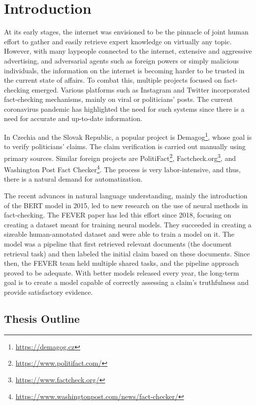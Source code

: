 \chapter*{Introduction}

At its early stages, the internet was envisioned to be the pinnacle of joint human effort to gather and easily retrieve expert knowledge on virtually any topic.
However, with many laypeople connected to the internet, extensive and aggressive advertising, and adversarial agents such as foreign powers or simply malicious individuals, the information on the internet is becoming harder to be trusted in the current state of affairs.
To combat this, multiple projects focused on fact-checking emerged. 
Various platforms such as Instagram and Twitter incorporated fact-checking mechanisms, mainly on viral or politicians' posts.
The current coronavirus pandemic has highlighted the need for such systems since there is a need for accurate and up-to-date information. 

In Czechia and the Slovak Republic, a popular project is Demagog\footnote{\url{https://demagog.cz}}, whose goal is to verify politicians' claims.
The claim verification is carried out manually using primary sources. 
Similar foreign projects are PolitiFact\footnote{\url{https://www.politifact.com/}}, Factcheck.org\footnote{\url{https://www.factcheck.org/}}, and Washington Post Fact Checker\footnote{\url{https://www.washingtonpost.com/news/fact-checker/}}.
The process is very labor-intensive, and thus, there is a natural demand for automatization.

The recent advances in natural language understanding, mainly the introduction of the BERT model \citep{bert} in 2015, led to new research on the use of neural methods in fact-checking.
The FEVER paper \citep{fever} has led this effort since 2018, focusing on creating a dataset meant for training neural models.
They succeeded in creating a sizeable human-annotated dataset and were able to train a model on it.
The model was a pipeline that first retrieved relevant documents (the document retrieval task) and then labeled the initial claim based on these documents. 
Since then, the FEVER team held multiple shared tasks, and the pipeline approach proved to be adequate.
With better models released every year, the long-term goal is to create a model capable of correctly assessing a claim's truthfulness and provide satisfactory evidence.

\section*{Thesis Outline}

